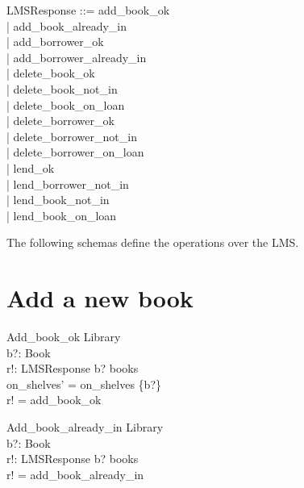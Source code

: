 \documentclass[11pt, fuzz]{article}
\begin{document}
\begin{zed}
    LMSResponse ::= add\_book\_ok               \\
                  | add\_book\_already\_in      \\
                  | add\_borrower\_ok           \\
                  | add\_borrower\_already\_in  \\
                  | delete\_book\_ok            \\
                  | delete\_book\_not\_in       \\
                  | delete\_book\_on\_loan      \\
                  | delete\_borrower\_ok        \\
                  | delete\_borrower\_not\_in   \\
                  | delete\_borrower\_on\_loan  \\
                  | lend\_ok                    \\
                  | lend\_borrower\_not\_in     \\
                  | lend\_book\_not\_in         \\
                  | lend\_book\_on\_loan        \\
\end{zed}


The following schemas define the operations over the LMS. 

\section{Add a new book}

\begin{schema}{Add\_book\_ok}
    \Delta Library  \\
    b?: Book        \\
    r!: LMSResponse 
\where
    b? \notin books                      \\
    on\_shelves' = on\_shelves \cup \{b?\} \\
    r! = add\_book\_ok
\end{schema}

\begin{schema}{Add\_book\_already\_in}
    \Xi Library     \\
    b?: Book        \\
    r!: LMSResponse
\where
    b? \in books                \\
    r! = add\_book\_already\_in
\end{schema}
\end{document}
